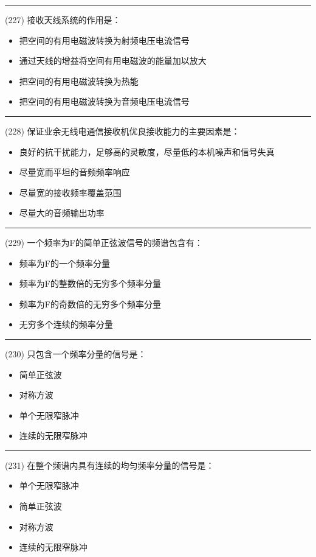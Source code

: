 \documentclass[twocolumn]{ctexart}  %
\begin{document}
\noindent\rule{0.5\textwidth}{1pt}
\heiti (227) 接收天线系统的作用是： \songti {\color{gray} [LK0421] }
\begin{itemize}
	\item  把空间的有用电磁波转换为射频电压电流信号
	\item  通过天线的增益将空间有用电磁波的能量加以放大
	\item  把空间的有用电磁波转换为热能
	\item  把空间的有用电磁波转换为音频电压电流信号
\end{itemize}


\noindent\rule{0.5\textwidth}{1pt}
\heiti (228) 保证业余无线电通信接收机优良接收能力的主要因素是： \songti {\color{gray} [LK0422] }
\begin{itemize}
	\item  良好的抗干扰能力，足够高的灵敏度，尽量低的本机噪声和信号失真
	\item  尽量宽而平坦的音频频率响应
	\item  尽量宽的接收频率覆盖范围
	\item  尽量大的音频输出功率
\end{itemize}


\noindent\rule{0.5\textwidth}{1pt}
\heiti (229) 一个频率为F的简单正弦波信号的频谱包含有： \songti {\color{gray} [LK0533] }
\begin{itemize}
	\item  频率为F的一个频率分量
	\item  频率为F的整数倍的无穷多个频率分量
	\item  频率为F的奇数倍的无穷多个频率分量
	\item  无穷多个连续的频率分量
\end{itemize}


\noindent\rule{0.5\textwidth}{1pt}
\heiti (230) 只包含一个频率分量的信号是： \songti {\color{gray} [LK0535] }
\begin{itemize}
	\item  简单正弦波
	\item  对称方波
	\item  单个无限窄脉冲
	\item  连续的无限窄脉冲
\end{itemize}


\noindent\rule{0.5\textwidth}{1pt}
\heiti (231) 在整个频谱内具有连续的均匀频率分量的信号是： \songti {\color{gray} [LK0536] }
\begin{itemize}
	\item  单个无限窄脉冲
	\item  简单正弦波
	\item  对称方波
	\item  连续的无限窄脉冲
\end{itemize}
\end{document}
